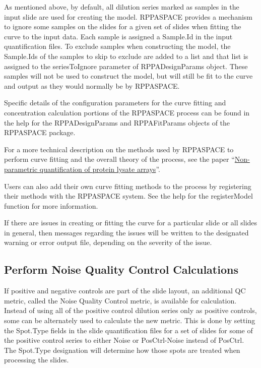 \documentclass[
]{article}
\begin{document}
As mentioned above, by default, all dilution series marked as samples in
the input slide are used for creating the model. RPPASPACE provides a
mechanism to ignore some samples on the slides for a given set of slides
when fitting the curve to the input data. Each sample is assigned a
Sample.Id in the input quantification files. To exclude samples when
constructing the model, the Sample.Ids of the samples to skip to exclude
are added to a list and that list is assigned to the seriesToIgnore
parameter of RPPADesignParams object. These samples will not be used to
construct the model, but will still be fit to the curve and output as
they would normally be by RPPASPACE.

Specific details of the configuration parameters for the curve fitting
and concentration calculation portions of the RPPASPACE process can be
found in the help for the RPPADesignParams and RPPAFitParams objects of
the RPPASPACE package.

For a more technical description on the methods used by RPPASPACE to
perform curve fitting and the overall theory of the process, see the
paper
``\href{https://academic.oup.com/bioinformatics/article/23/15/1986/205819}{Non-parametric
quantification of protein lysate arrays}''.

Users can also add their own curve fitting methods to the process by
registering their methods with the RPPASPACE system. See the help for
the registerModel function for more information.

If there are issues in creating or fitting the curve for a particular
slide or all slides in general, then messages regarding the issues will
be written to the designated warning or error output file, depending on
the severity of the issue.

\hypertarget{process_5}{%
\subsection{Perform Noise Quality Control
Calculations}\label{process_5}}

If positive and negative controls are part of the slide layout, an
additional QC metric, called the Noise Quality Control metric, is
available for calculation. Instead of using all of the positive control
dilution series only as positive controls, some can be alternately used
to calculate the new metric. This is done by setting the Spot.Type
fields in the slide quantification files for a set of slides for some of
the positive control series to either Noise or PosCtrl-Noise instead of
PosCtrl. The Spot.Type designation will determine how those spots are
treated when processing the slides.
\end{document}
